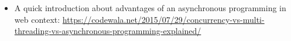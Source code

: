 \begin{itemize}
	\item A quick introduction about advantages of an asynchronous programming in web context: \url{https://codewala.net/2015/07/29/concurrency-vs-multi-threading-vs-asynchronous-programming-explained/}
\end{itemize}